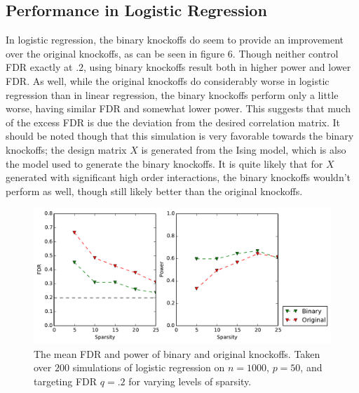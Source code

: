 \documentclass[11pt]{article}
\theoremstyle{definition}
\begin{document}
\subsection{Performance in Logistic Regression} 
    \FloatBarrier
    In logistic regression, the binary knockoffs do seem to provide an improvement over the original knockoffs, as can be seen in figure 6. Though neither control FDR exactly at $.2$, using binary knockoffs result both in higher power and lower FDR. As well, while the original knockoffs do considerably worse in logistic regression than in linear regression, the binary knockoffs perform only a little worse, having similar FDR and somewhat lower power. This suggests that much of the excess FDR is due the deviation from the desired correlation matrix. It should be noted though that this simulation is very favorable towards the binary knockoffs; the design matrix $X$ is generated from the Ising model, which is also the model used to generate the binary knockoffs. It is quite likely that for $X$ generated with significant high order interactions, the binary knockoffs wouldn't perform as well, though still likely better than the original knockoffs. 
    \begin{figure}[h]
        \begin{center}
        \includegraphics[width=14cm]{images/logit_FDR_power_50}
    \end{center}
    \caption{\linespread{1}\selectfont{}The mean FDR and power of binary and original knockoffs. Taken over $200$ simulations of logistic regression on $n=1000$, $p=50$, and targeting FDR $q=.2$ for varying levels of sparsity.}  
    \end{figure}
\end{document}
